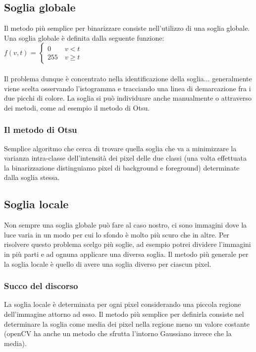 \subsection{Soglia globale}
Il metodo più semplice per binarizzare consiste nell'utilizzo di una soglia globale. Una soglia globale è definita dalla seguente funzione:\\
$f(v, t)$ = 
$
\begin{cases}
	0 \quad \quad v < t\\
	255 \quad v \geq t
\end{cases}
$	
\\\\
Il problema dunque è concentrato nella identificazione della soglia... generalmente viene scelta osservando l'istogramma e tracciando una linea di demarcazione fra i due picchi di colore. La soglia si può individuare anche manualmente o attraverso dei metodi, come ad esempio il metodo di Otsu.
\subsubsection{Il metodo di Otsu}

Semplice algoritmo che cerca di trovare quella soglia che va a minimizzare la varianza intra-classe dell'intensità dei pixel delle due classi (una volta effettuata la binarizzazione distinguiamo pixel di background e foreground) determinate dalla soglia stessa. 

\subsection{Soglia locale}
Non sempre una soglia globale può fare al caso nostro, ci sono immagini dove la luce varia in un modo per cui lo sfondo è molto più scuro che in altre. Per risolvere questo problema scelgo più soglie, ad esempio potrei dividere l'immagini in più parti e ad ognuna applicare una diversa soglia. Il metodo più
generale per la soglia locale è quello di avere una soglia diverso per ciascun pixel. 
\subsubsection{Succo del discorso}
La soglia locale è determinata per ogni pixel considerando una piccola regione dell'immagine attorno ad esso. Il metodo più semplice per definirla consiste nel determinare la soglia come media dei pixel nella regione meno un valore costante (openCV ha anche un metodo che sfrutta l'intorno Gaussiano invece che la media).

